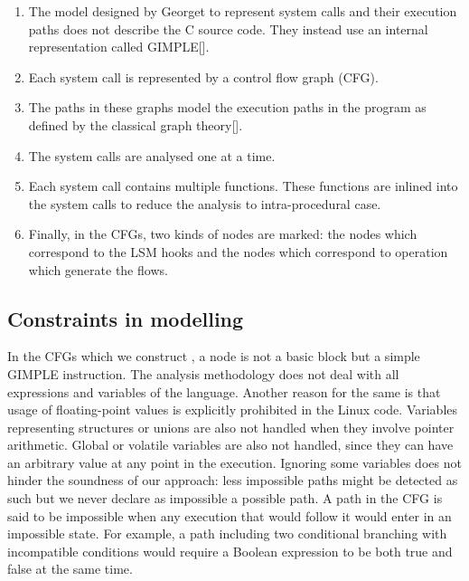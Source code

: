 \begin{enumerate}
	\item The model designed by Georget to represent system calls and their execution paths does not describe the C source code. They instead use an internal representation called GIMPLE[]. 
	\item Each system call is represented by a control flow graph (CFG).
	\item The paths in these graphs model the execution paths in the program as defined by the classical graph theory[].
	\item The system calls are analysed one at a time. 
	\item Each system call contains multiple functions. These functions are inlined into the system calls to reduce the analysis to intra-procedural case. 
	\item Finally, in the CFGs, two kinds of nodes are marked: the nodes which correspond to the LSM hooks and the nodes which correspond to operation which generate the flows. 
	
\end{enumerate}

\subsection{Constraints in modelling}
In the CFGs which we construct , a node is not a basic block but a simple GIMPLE instruction. The analysis methodology does not deal with all expressions and variables of the language. Another reason for the same is that usage of floating-point values is explicitly prohibited in the Linux code. Variables representing structures or unions are also not handled when they involve pointer arithmetic. Global or volatile variables are also not handled, since they can have an arbitrary value at any point in the execution. Ignoring some variables does not hinder the soundness of
our approach: less impossible paths might be detected as such but
we never declare as impossible a possible path. A path in the CFG is said to be impossible when any execution
that would follow it would enter in an impossible state. For example,
a path including two conditional branching with incompatible
conditions would require a Boolean expression to be both true and
false at the same time. 


